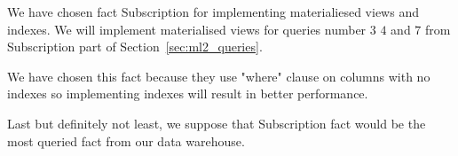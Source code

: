 
We have chosen fact Subscription for implementing materialiesed views and indexes.
We will implement materialised views for queries number $3$ $4$ and $7$ from Subscription part of Section~\ref{sec:ml2_queries}.
    
 We have chosen this fact because they use "where" clause on columns with no indexes so implementing indexes will result in better performance.
 
Last but definitely not least, we suppose that Subscription fact would be the most queried fact from our data warehouse.
